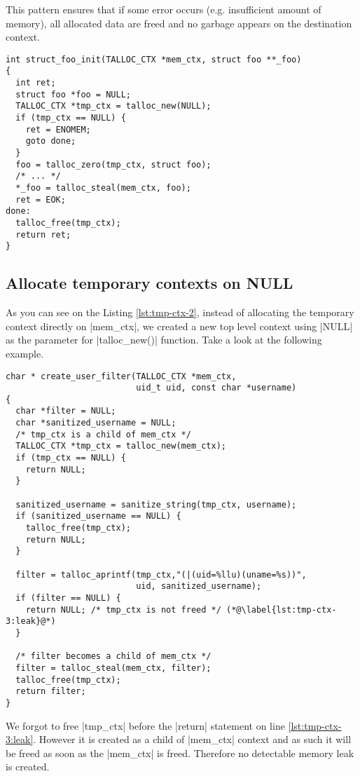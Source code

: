 This pattern ensures that if some error occurs (e.g. insufficient amount of
memory), all allocated data are freed and no garbage appears on the destination
context.

\begin{lstlisting}[caption={Temporary context \#2},label=lst:tmp-ctx-2]
int struct_foo_init(TALLOC_CTX *mem_ctx, struct foo **_foo)
{
  int ret;
  struct foo *foo = NULL;
  TALLOC_CTX *tmp_ctx = talloc_new(NULL);
  if (tmp_ctx == NULL) {
    ret = ENOMEM;
    goto done;
  }
  foo = talloc_zero(tmp_ctx, struct foo);
  /* ... */
  *_foo = talloc_steal(mem_ctx, foo);
  ret = EOK;
done:
  talloc_free(tmp_ctx);
  return ret;
}
\end{lstlisting}

\subsection{Allocate temporary contexts on NULL}
\label{talloc:subsec:tmp-ctx-on-null}

As you can see on the Listing \ref{lst:tmp-ctx-2}, instead of allocating the
temporary context directly on |mem_ctx|, we created a new top level context
using |NULL| as the parameter for |talloc_new()| function. Take a look at the
following example.

\begin{lstlisting}[caption={Temporary context \#3},label=lst:tmp-ctx-3]
char * create_user_filter(TALLOC_CTX *mem_ctx,
                          uid_t uid, const char *username)
{
  char *filter = NULL;
  char *sanitized_username = NULL;
  /* tmp_ctx is a child of mem_ctx */
  TALLOC_CTX *tmp_ctx = talloc_new(mem_ctx);
  if (tmp_ctx == NULL) {
    return NULL;
  }
  
  sanitized_username = sanitize_string(tmp_ctx, username);
  if (sanitized_username == NULL) {
    talloc_free(tmp_ctx);
    return NULL;
  }
  
  filter = talloc_aprintf(tmp_ctx,"(|(uid=%llu)(uname=%s))",
                          uid, sanitized_username);
  if (filter == NULL) {
    return NULL; /* tmp_ctx is not freed */ (*@\label{lst:tmp-ctx-3:leak}@*)
  }
  
  /* filter becomes a child of mem_ctx */
  filter = talloc_steal(mem_ctx, filter);
  talloc_free(tmp_ctx);
  return filter;
}
\end{lstlisting}

We forgot to free |tmp_ctx| before the |return| statement on line
\ref{lst:tmp-ctx-3:leak}. However it is created as a child of |mem_ctx| context
and as such it will be freed as soon as the |mem_ctx| is freed. Therefore no
detectable memory leak is created.

